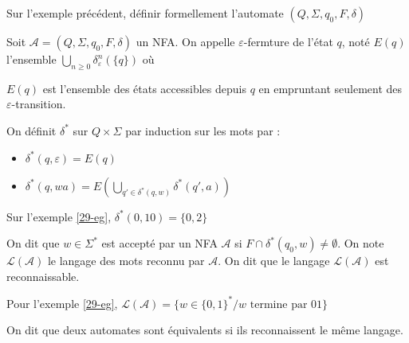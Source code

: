 \begin{exercise}
	Sur l'exemple précédent, définir formellement l'automate $(Q, \Sigma, q_0, F, \delta)$
\end{exercise}

\begin{definition}
	Soit $\mathcal A = (Q, \Sigma, q_0, F, \delta)$ un NFA. On appelle $\varepsilon$-fermture de l'état $q$, noté $E(q)$ l'ensemble $\bigcup\limits_{n \geq 0} \delta^n_\varepsilon(\{q\})$ où 
\end{definition}

\begin{idee}
	$E(q)$ est l'ensemble des états accessibles depuis $q$ en empruntant seulement des $\varepsilon$-transition.
\end{idee}
\begin{definition}
	On définit $\delta^*$ sur $Q\times \Sigma$ par induction sur les mots par :\begin{itemize}[label=$\star$]
		\item $\delta^*(q, \varepsilon) = E(q)$
		\item $\delta^*(q, wa) = E\left(\bigcup\limits_{q' \in \delta^*(q, w)} \delta^*(q', a)\right)$
	\end{itemize}
\end{definition}

\begin{example}
	Sur l'exemple \ref{29-eg}, $\delta^*(0, 10) = \{0, 2\}$
\end{example}

\begin{definition}
	On dit que $w \in \Sigma^*$ est accepté par un NFA $\mathcal A$ si $F \cap \delta^*(q_0, w) \neq \emptyset$. On note $\mathcal L(\mathcal A)$ le langage des mots reconnu par $\mathcal A$. On dit que le langage $\mathcal L(\mathcal A)$ est reconnaissable.
\end{definition}

\begin{example}
	Pour l'exemple \ref{29-eg}, $\mathcal L(\mathcal A) = \{w \in \{0, 1\}^* / w \text{ termine par } 01\}$
\end{example}

\begin{definition}
	On dit que deux automates sont équivalents si ils reconnaissent le même langage.
\end{definition}


